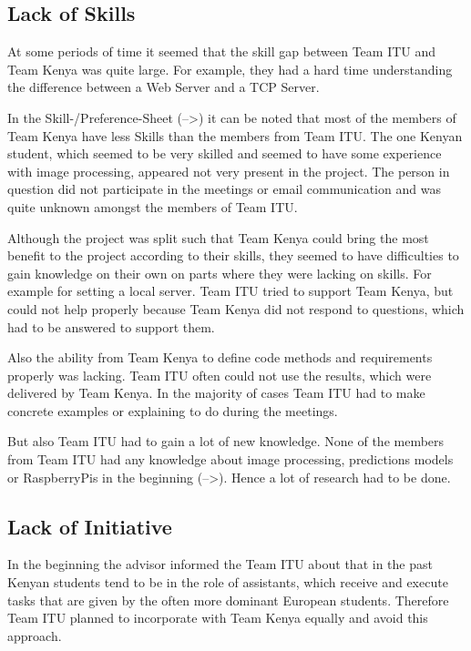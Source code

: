 
\subsection{Lack of Skills}
At some periods of time it seemed that the skill gap between Team ITU and Team Kenya was quite large. For example, they had a hard time understanding the difference between a Web Server and a TCP Server.

In the Skill-/Preference-Sheet (-->) it can be noted that most of the members of Team Kenya have less Skills than the members from Team ITU. The one Kenyan student, which seemed to be very skilled and seemed to have some experience with image processing, appeared not very present in the project. The person in question did not participate in the meetings or email communication and was quite unknown amongst the members of Team ITU.

Although the project was split such that Team Kenya could bring the most benefit to the project according to their skills, they seemed to have difficulties to gain knowledge on their own on parts where they were lacking on skills. For example for setting a local server. Team ITU tried to support Team Kenya, but could not help properly because Team Kenya did not respond to questions, which had to be answered to support them. 

Also the ability from Team Kenya to define code methods and requirements properly was lacking. Team ITU often could not use the results, which were delivered by Team Kenya. In the majority of cases Team ITU had to make concrete examples or explaining to do during the meetings.

But also Team ITU had to gain a lot of new knowledge. None of the members from Team ITU had any knowledge about image processing, predictions models or RaspberryPis in the beginning  (-->). Hence a lot of research had to be done. 


\subsection{Lack of Initiative}
In the beginning the advisor informed the Team ITU about that in the past Kenyan students tend to be in the role of assistants, which receive and execute tasks that are given by the often more dominant European students. Therefore Team ITU planned to incorporate with Team Kenya equally and avoid this approach.

